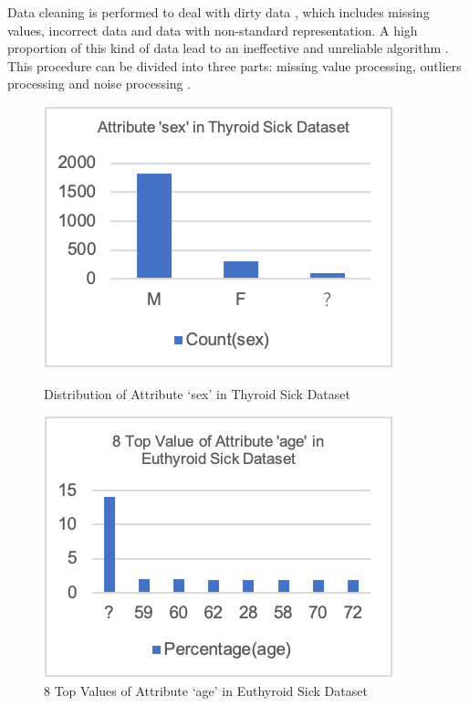 Data cleaning is performed to deal with dirty data \cite{77}, which includes missing values, incorrect data and data with non-standard representation. A high proportion of this kind of data lead to an ineffective and unreliable algorithm \cite{81}. This procedure can be divided into three parts: missing value processing, outliers processing and noise processing \cite{79}.
\begin{figure}[h]
    \centering 
    \begin{minipage}{0.45\textwidth}
        \includegraphics[width=\textwidth]{images/fig9}
        \caption{Distribution of Attribute `sex' in Thyroid Sick Dataset}
        \label{fig9}
    \end{minipage}
    \quad
    \begin{minipage}{0.45\textwidth}
        \includegraphics[width=\textwidth]{images/fig10}
        \caption{8 Top Values of Attribute `age' in Euthyroid Sick Dataset}
        \label{fig10}
    \end{minipage}
\end{figure}

